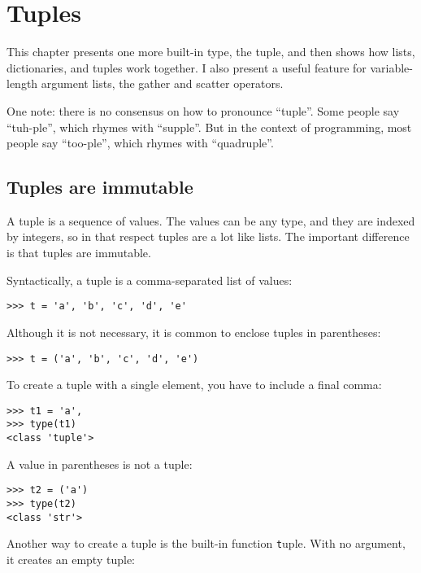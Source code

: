 \documentclass[
DIV=11,
fontsize=12,
twoside,
headinclude=false,
titlepage=firstiscover,
abstract=true,
headsepline=true,
footsepline=true,
chapterprefix=true, %
headings=big,
bibliography=totoc,%
captions=tableheading
]{scrbook}
\theoremstyle{definition}
\begin{document}
\chapter{Tuples}
\label{tuplechap}

This chapter presents one more built-in type, the tuple, and then
shows how lists, dictionaries, and tuples work together.
I also present a useful feature for variable-length argument lists,
the gather and scatter operators.

One note: there is no consensus on how to pronounce ``tuple''.
Some people say ``tuh-ple'', which rhymes with ``supple''.  But
in the context of programming, most people say ``too-ple'', which
rhymes with ``quadruple''.


\section{Tuples are immutable}

A tuple is a sequence of values.  The values can be any type, and
they are indexed by integers, so in that respect tuples are a lot
like lists.  The important difference is that tuples are immutable.

Syntactically, a tuple is a comma-separated list of values:

\begin{lstlisting}
>>> t = 'a', 'b', 'c', 'd', 'e'
\end{lstlisting}
%
Although it is not necessary, it is common to enclose tuples in
parentheses:

\begin{lstlisting}
>>> t = ('a', 'b', 'c', 'd', 'e')
\end{lstlisting}
%
To create a tuple with a single element, you have to include a final
comma:

\begin{lstlisting}
>>> t1 = 'a',
>>> type(t1)
<class 'tuple'>
\end{lstlisting}
%
A value in parentheses is not a tuple:

\begin{lstlisting}
>>> t2 = ('a')
>>> type(t2)
<class 'str'>
\end{lstlisting}
%
Another way to create a tuple is the built-in function {\texttt tuple}.
With no argument, it creates an empty tuple:
\end{document}
